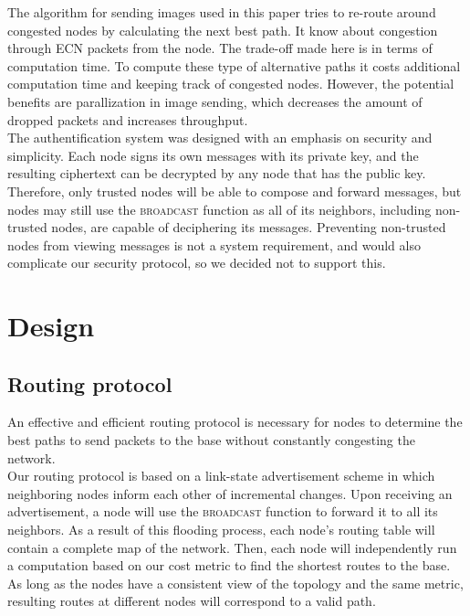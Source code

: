 \documentclass[letterpaper]{article}
\begin{document}
\noindent The algorithm for sending images used in this paper tries to re-route around congested nodes by calculating the next best path. It know about congestion through ECN packets from the node. The trade-off made here is in terms of computation time. To compute these type of alternative paths it costs additional computation time and keeping track of congested nodes. However, the potential benefits are parallization in image sending, which decreases the amount of dropped packets and increases throughput.
\\

\noindent The authentification system was designed with an emphasis on security and simplicity.
Each node signs its own messages with its private key, and the resulting ciphertext can be decrypted by any
node that has the public key. Therefore, only trusted nodes will be able to compose and forward messages, but
nodes may still use the \textsc{broadcast} function as all of its neighbors, including non-trusted nodes, are
capable of deciphering its messages. Preventing non-trusted nodes from viewing messages is not a system 
requirement, and would also complicate our security protocol, so we decided not to support this.

\section{Design}

\subsection{Routing protocol}

An effective and efficient routing protocol is necessary for nodes to determine the best paths to send
packets to the base without constantly congesting the network.
\\

\noindent Our routing protocol is based on a link-state advertisement scheme in which neighboring nodes 
inform each other of incremental changes. Upon receiving an advertisement, a node will use the 
\textsc{broadcast} function to forward it to all its neighbors. As a result of this flooding process,
each node's routing table will contain a complete map of the network. Then, each node will independently
run a computation based on our cost metric to find the shortest routes to the base. As long as the nodes
have a consistent view of the topology and the same metric, resulting routes at different nodes will
correspond to a valid path.
\\
\end{document}
